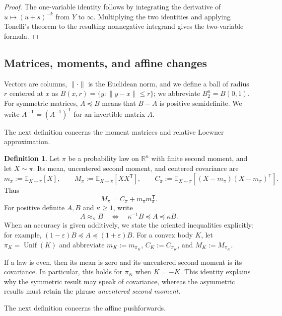 \documentclass[11pt]{article}
\numberwithin{equation}{section}
\theoremstyle{definition}
\newtheorem{definition}[definition]{Definition}
\newcommand{\E}[2]{\mathbb{E}_{#1}\left[#2\right]}
\begin{document}
\begin{proof}
The one-variable identity follows by integrating the derivative of
$u\mapsto(u+s)^{-k}$ from
$Y$ to
$\infty$.
Multiplying the two identities and applying Tonelli's theorem to the resulting
nonnegative integrand gives the two-variable formula.
\end{proof}

\subsection{Matrices, moments, and affine changes}
\label{sec:prelim-moments}

Vectors are columns, $\|\cdot\|$ is the Euclidean norm, and we define a ball of
radius
$r$ centered at
$x$ as
$B(x,r)=\{y:\|y-x\|\leq r\}$; we abbreviate
$B_2^n=B(0,1)$.
For symmetric matrices, $A\preceq B$ means that
$B-A$ is positive semidefinite.
We write $A^{-\mathsf T}=(A^{-1})^{\mathsf T}$ for an invertible matrix
$A$.

The next definition concerns the moment matrices and relative Loewner
approximation.

\begin{definition}
\label{def:moment-matrices}
Let $\pi$ be a probability law on
$\mathbb R^n$ with finite second moment, and let
$X\sim\pi$.
Its mean, uncentered second moment, and centered covariance are
\[
m_\pi:=\E{X\sim\pi}{X},
\qquad
M_\pi:=\E{X\sim\pi}{XX^{\mathsf T}},
\qquad
C_\pi:=\E{X\sim\pi}{(X-m_\pi)(X-m_\pi)^{\mathsf T}}.
\]
Thus
\begin{equation}
\label{eq:raw-centered}
 M_\pi=C_\pi+m_\pi m_\pi^{\mathsf T}.
\end{equation}
For positive definite $A,B$ and
$\kappa\geq1$, write
\[
A\approx_\kappa B
\quad
\Longleftrightarrow
\quad
\kappa^{-1}B
\preceq A
\preceq\kappa B.
\]
When an accuracy is given additively, we state the oriented inequalities
explicitly; for example, $(1-\varepsilon)B\preceq A\preceq(1+\varepsilon)B$.
For a convex body $K$, let
$\pi_K=\operatorname{Unif}(K)$ and abbreviate
$m_K:=m_{\pi_K}$,
$C_K:=C_{\pi_K}$, and
$M_K:=M_{\pi_K}$.
\end{definition}

If a law is even, then its mean is zero and its uncentered second moment is its
covariance.
In particular, this holds for $\pi_K$ when
$K=-K$.
This identity explains why the symmetric result may speak of covariance, whereas
the asymmetric results must retain the phrase \emph{uncentered
second moment}.

The next definition concerns the affine pushforwards.
\end{document}
